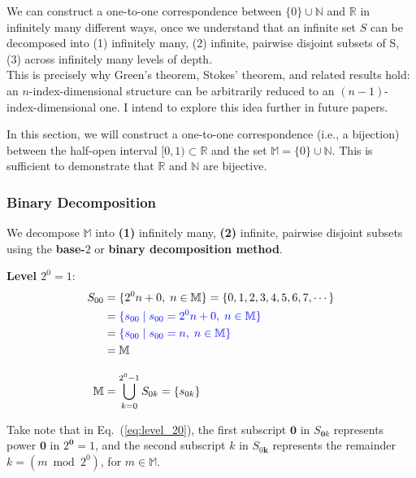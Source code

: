 \documentclass[12pt]{article}
\theoremstyle{definition} %
\numberwithin{equation}{section}
\newcommand{\eqrefc}[1]{Eq.~(\ref{eq:#1})}
\begin{document}
We can construct a one-to-one correspondence between \( \{0\} \cup \mathbb{N} \) and \( \mathbb{R} \) in infinitely many different ways, once we understand that an infinite set \( S \) can be decomposed into (1) infinitely many, (2) infinite, pairwise disjoint subsets of S, (3) across infinitely many levels of depth.\\


This is precisely why Green's theorem, Stokes' theorem, and related results hold: an \( n \)-index-dimensional structure can be arbitrarily reduced to an \( (n\!-\!1) \)-index-dimensional one. I intend to explore this idea further in future papers.

\vspace{1em}
In this section, we will construct a one-to-one correspondence (i.e., a bijection) between the half-open interval \( [0, 1) \subset \mathbb{R} \) and the set \( \mathbb{M} = \{0\} \cup \mathbb{N} \). This is sufficient to demonstrate that \( \mathbb{R} \) and \( \mathbb{N} \) are bijective.

\subsubsection{Binary Decomposition}
\label{sec:binary-decomposition}
We decompose \( \mathbb{M} \) into \textbf{(1)} infinitely many, \textbf{(2)} infinite, pairwise disjoint subsets using the \textbf{base-\(2\)} or \textbf{binary decomposition method}.
 
\vspace{1em}
\textbf{Level \(2^0 = 1\)}:
\begin{align}
S_{00} &= \{2^0n + 0,\; n \in \mathbb{M}\} = \{0, 1, 2, 3, 4, 5, 6, 7, \cdots\} \\
&= \textcolor{blue}{\{s_{00} \mid s_{00} = 2^0n+0,\; n \in \mathbb{M}\}}\\
&= \textcolor{blue}{\{s_{00} \mid s_{00} = n, \; n \in \mathbb{M}\}}\\
&= \mathbb{M} \\[2ex]
\mathbb{M} &= \bigcup_{k=0}^{2^0-1}S_{0k} = \{ s_{0k} \} \label{eq:level_20}
\end{align}

Take note that in \eqrefc{level_20}, the first subscript \(\bm{0}\) in \(S_{\bm{0}k}\) represents power \(\bm{0}\) in \(2^{\bm{0}}=1\), and the second subscript \(k\) in \(S_{0\bm{k}}\) represents the remainder \(k = (m\!\bmod\!2^0)\), for \(m \in \mathbb{M}\).
\end{document}
